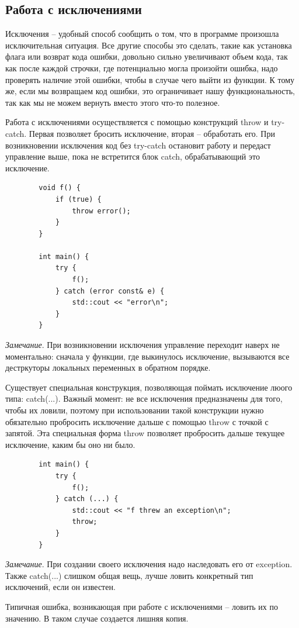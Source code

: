 \documentclass[12pt, a4paper]{article}
\begin{document}
	\subsection{Работа с исключениями}
	Исключения -- удобный способ сообщить о том, что в программе произошла исключительная ситуация. Все другие способы это сделать, такие как установка флага или возврат кода ошибки, довольно сильно увеличивают объем кода, так как после каждой строчки, где потенциально могла произойти ошибка, надо проверять наличие этой ошибки, чтобы в случае чего выйти из функции. К тому же, если мы возвращаем код ошибки, это ограничивает нашу функциональность, так как мы не можем вернуть вместо этого что-то полезное.
	\par Работа с исключениями осуществляется с помощью конструкций throw и try-catch. Первая позволяет бросить исключение, вторая -- обработать его. При возникновении исключения код без try-catch остановит работу и передаст управление выше, пока не встретится блок catch, обрабатывающий это исключение. 
	\begin{verbatim}
		void f() {
			if (true) {
				throw error();
			}
		}
		
		int main() {
			try {
				f();
			} catch (error const& e) {
				std::cout << "error\n";
			}
		}
	\end{verbatim}
	\textit{Замечание}. При возникновении исключения управление переходит наверх не моментально: сначала у функции, где выкинулось исключение, вызываются все дестркуторы локальных переменных в обратном порядке.
	\par Существует специальная конструкция, позволяющая поймать исключение люого типа: catch(...). Важный момент: не все исключения предназначены для того, чтобы их ловили, поэтому при использовании такой конструкции нужно обязательно пробросить исключение дальше с помощью throw с точкой с запятой. Эта специальная форма throw позволяет пробросить дальше текущее исключение, каким бы оно ни было.
	\begin{verbatim}
		int main() {
			try {
				f();
			} catch (...) {
				std::cout << "f threw an exception\n";
				throw;
			}
		}
	\end{verbatim}
	\textit{Замечание}. При создании своего исключения надо наследовать его от exception. Также catch(...) слишком общая вещь, лучше ловить конкретный тип исключений, если он известен.
	\\\par Типичная ошибка, возникающая при работе с исключениями -- ловить их по значению. В таком случае создается лишняя копия.
\end{document}
